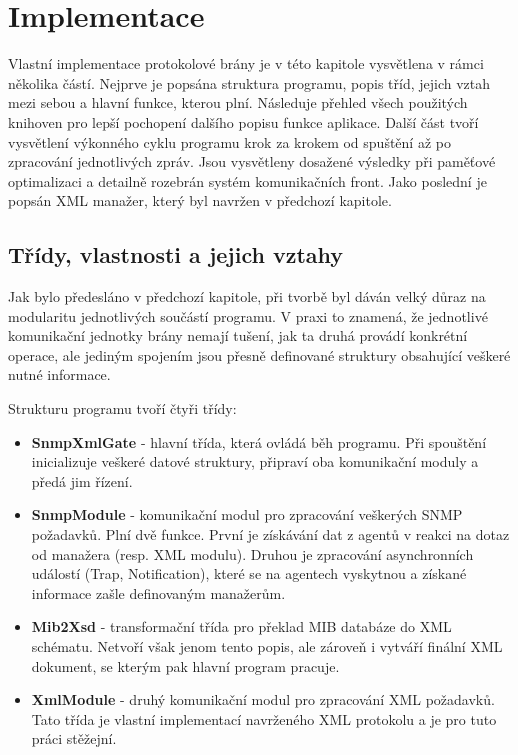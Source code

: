 \chapter{Implementace}
\label{kap_implementace}

Vlastní implementace protokolové brány je v této kapitole vysvětlena v rámci několika částí. Nejprve je popsána
struktura programu, popis tříd, jejich vztah mezi sebou a hlavní funkce, kterou plní. Následuje přehled všech použitých knihoven pro
lepší pochopení dalšího popisu funkce aplikace. Další část tvoří vysvětlení výkonného cyklu programu krok za krokem od spuštění až po
zpracování jednotlivých zpráv. Jsou vysvětleny dosažené výsledky při paměťové optimalizaci a detailně rozebrán systém komunikačních front.
Jako poslední je popsán XML manažer, který byl navržen v předchozí kapitole.

\section{Třídy, vlastnosti a jejich vztahy}
Jak bylo předesláno v předchozí kapitole, při tvorbě byl dáván velký důraz na modularitu jednotlivých součástí programu.
V praxi to znamená, že jednotlivé komunikační jednotky brány nemají tušení, jak ta druhá provádí konkrétní
operace, ale jediným spojením jsou přesně definované struktury obsahující veškeré nutné informace.

Strukturu programu tvoří čtyři třídy:
\begin{itemize}
	\item \textbf{SnmpXmlGate} - hlavní třída, která ovládá běh programu. Při spouštění inicializuje veškeré datové struktury,
	připraví oba komunikační moduly a předá jim řízení.
	\item \textbf{SnmpModule}  - komunikační modul pro zpracování veškerých SNMP požadavků. Plní dvě funkce. První je získávání dat
	z agentů v reakci na dotaz od manažera (resp. XML modulu). Druhou je zpracování asynchronních událostí (Trap, Notification), které
	se na agentech vyskytnou a získané informace zašle definovaným manažerům.
	\item \textbf{Mib2Xsd}	   - transformační třída pro překlad MIB databáze do XML schématu. Netvoří však jenom tento popis, ale zároveň 
	i vytváří finální XML dokument, se kterým pak hlavní program pracuje.
	\item \textbf{XmlModule}   - druhý komunikační modul pro zpracování XML požadavků. Tato třída je vlastní implementací
	navrženého XML protokolu a je pro tuto práci stěžejní.
\end{itemize}


